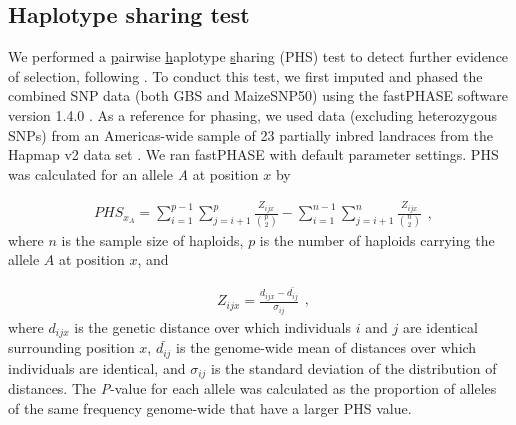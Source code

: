 \subsection*{Haplotype sharing test}
We performed a \underline{p}airwise \underline{h}aplotype \underline{s}haring (PHS) test to detect further evidence of selection, following \cite{Toomajian_2006_16623598}.  
To conduct this test, we first imputed and phased the combined SNP data (both GBS and MaizeSNP50) using the {\sf fastPHASE} software version 1.4.0 \cite[]{Scheet_2006_16532393}.  
As a reference for phasing, we used data (excluding heterozygous SNPs) from an Americas-wide sample of 23 partially inbred landraces from the Hapmap v2 data set  \cite[]{Chia_2012_22660545}.  
We ran {\sf fastPHASE}  with default parameter settings.  
PHS was calculated for an allele \emph{A} at position $x$ by


\begin{equation}
  \label{phs-1}
  \begin{array}{l}
  \displaystyle{
PHS_{x_A} = \sum^{p-1}_{i=1}\sum^{p}_{j=i+1} \frac{ Z_{ijx} }{ {p \choose 2} } - \sum^{n-1}_{i=1}\sum^{n}_{j=i+1} \frac{ Z_{ijx}  }{ {n \choose 2}}
  }
  \end {array} 
  \textrm{,}
\end{equation}
\noindent where $n$ is the sample size of haploids, $p$  is the number of haploids carrying the allele $A$ at position $x$, and

\begin{equation}
  \label{phs-2}
  \begin{array}{l}
  \displaystyle{
Z_{ijx} = \frac{ d_{ijx} - \bar{d_{ij}} }{ \sigma_{ij} }
  }
  \end {array} 
  \textrm{,}
\end{equation}
\noindent where $d_{ijx}$ is the genetic distance over which individuals $i$ and $j$ are identical surrounding position $x$, $\bar{d_{ij}}$ is the genome-wide mean of distances over which individuals are identical, and $\sigma_{ij}$ is the standard deviation of the distribution of distances.  
The \emph{P}-value for each allele was calculated as the proportion of alleles of the same frequency genome-wide that have a larger PHS value. 


